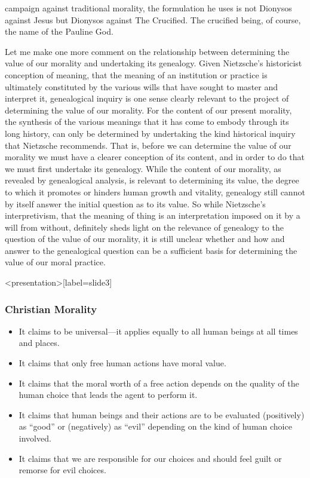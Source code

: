 campaign against traditional morality, the formulation he uses is not Dionysos against Jesus but Dionysos against The Crucified. The crucified being, of course, the name of the Pauline God.

Let me make one more comment on the relationship between determining the value of our morality and undertaking its genealogy. Given Nietzsche's historicist conception of meaning, that the meaning of an institution or practice is ultimately constituted by the various wills that have sought to master and interpret it, genealogical inquiry is one sense clearly relevant to the project of determining the value of our morality. For the content of our present morality, the synthesis of the various meanings that it has come to embody through its long history, can only be determined by undertaking the kind historical inquiry that Nietzsche recommends. That is, before we can determine the value of our morality we must have a clearer conception of its content, and in order to do that we must first undertake its genealogy. While the content of our morality, as revealed by genealogical analysis, is relevant to determining its value, the degree to which it promotes or hinders human growth and vitality, genealogy still cannot by itself answer the initial question as to its value. So while Nietzsche's interpretivism, that the meaning of thing is an interpretation imposed on it by a will from without, definitely sheds light on the relevance of genealogy to the question of the value of our morality, it is still unclear whether and how and answer to the genealogical question can be a sufficient basis for determining the value of our moral practice. \change

\begin{frame}<presentation>[label=slide3]
    \frametitle{Christian Morality}
        \begin{itemize}
            \item It claims to be universal---it applies equally to all human beings at all times and places.
            \item It claims that only free human actions have moral value.
            \item It claims that the moral worth of a free action depends on the quality of the human choice that leads the agent to perform it.
            \item It claims that human beings and their actions are to be evaluated (positively) as  ``good'' or (negatively) as  ``evil'' depending on the kind of human choice involved.
            \item It claims that we are responsible for our choices and should feel guilt or remorse for evil choices.
        \end{itemize}
\end{frame}

